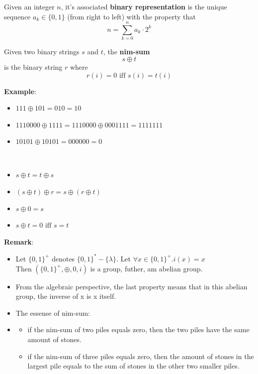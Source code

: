 \begin{definition}
    Given an integer $n$, it's associated \textbf{binary representation} is the unique sequence $a_k \in \{0,1\}$ (from right to left) with the property that $$n=\sum_{k=0}^na_k\cdot 2^k$$
\end{definition}

\begin{definition}
    Given two binary strings $s$ and $t$, the \textbf{nim-sum} $$s \oplus t$$ 
    is the binary string $r$ where $$r(i)=0 \text{ iff } s(i)=t(i)$$
\end{definition}
\textbf{Example}:
\begin{itemize}
    \item $111 \oplus 101=010=10$
    \item $1110000 \oplus 1111 = 1110000 \oplus 0001111=1111111$
    \item $10101 \oplus 10101=000000=0$
\end{itemize}

\begin{theorem}\
    \begin{itemize}
        \item $s \oplus t = t \oplus s$
        \item $(s \oplus t) \oplus r = s \oplus (r \oplus t)$
        \item $s \oplus 0=s$
        \item $s \oplus t =0 \text{ iff } s=t$
    \end{itemize}
\end{theorem}
\textbf{Remark}:
\begin{itemize}
    \item Let $\{0,1\}^+$ denotes $\{0,1\}^*-\{\lambda\}$. 
    Let $\forall x \in \{0,1\}^+.i(x)=x$\\
    Then $(\{0,1\}^+, \oplus, 0, i)$ is a group, futher, am abelian group.
    \item From the algebraic perspective, the last property means that in this abelian group, the inverse of x is x itself.
    \item The essense of nim-sum:
    \item \begin{itemize}
        \item if the nim-sum of two piles equals zero, then the two piles have the same amount of stones.
        \item if the nim-sum of three piles equals zero, then the amount of stones in the largest pile equals to the sum of stones in the other two smaller piles.
    \end{itemize}
\end{itemize}

